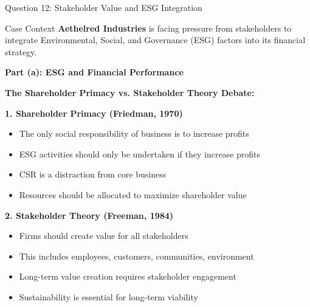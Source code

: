 \documentclass[aspectratio=169]{beamer}
\newcommand{\question}[1]{{\large\bfseries\color{crimson}#1}}
\newcommand{\subquestion}[1]{{\bfseries\color{darkgreen}#1}}
\begin{document}
	\begin{frame}{Question 12: Stakeholder Value and ESG Integration}
		\begin{block}{Case Context}
			\textbf{Aethelred Industries} is facing pressure from stakeholders to integrate Environmental, Social, and Governance (ESG) factors into its financial strategy.
		\end{block}
		
		\question{Part (a): ESG and Financial Performance}
		
		\textbf{The Shareholder Primacy vs. Stakeholder Theory Debate:}
		
		\subquestion{1. Shareholder Primacy (Friedman, 1970)}
		\begin{itemize}
			\item The only social responsibility of business is to increase profits
			\item ESG activities should only be undertaken if they increase profits
			\item CSR is a distraction from core business
			\item Resources should be allocated to maximize shareholder value
		\end{itemize}
		
		\subquestion{2. Stakeholder Theory (Freeman, 1984)}
		\begin{itemize}
			\item Firms should create value for all stakeholders
			\item This includes employees, customers, communities, environment
			\item Long-term value creation requires stakeholder engagement
			\item Sustainability is essential for long-term viability
		\end{itemize}
	\end{frame}
	
\end{document}
